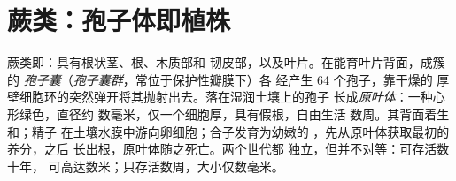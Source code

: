 \section{蕨类：孢子体即植株}

\begin{definition}[蕨类的生命周期]\label{def:b2:plant-life-cycles:fern}
蕨类即\emph{}：具有根状茎、根、木质部和
韧皮部，以及叶片。在能育叶片背面，成簇的
\emph{孢子囊}（\emph{孢子囊群}，常位于保护性瓣膜下）各
经产生 64 个孢子，靠干燥的
厚壁细胞环的突然弹开将其抛射出去。落在湿润土壤上的孢子
长成\emph{原叶体}：一种心形绿色，直径约
数毫米，仅一个细胞厚，具有假根，自由生活
数周。其背面着生和；精子
在土壤水膜中游向卵细胞；合子发育为幼嫩的
，先从原叶体获取最初的养分，之后
长出根，原叶体随之死亡。两个世代都
独立，但并不对等：可存活数十年，
可高达数米；只存活数周，大小仅数毫米。
\end{definition}

